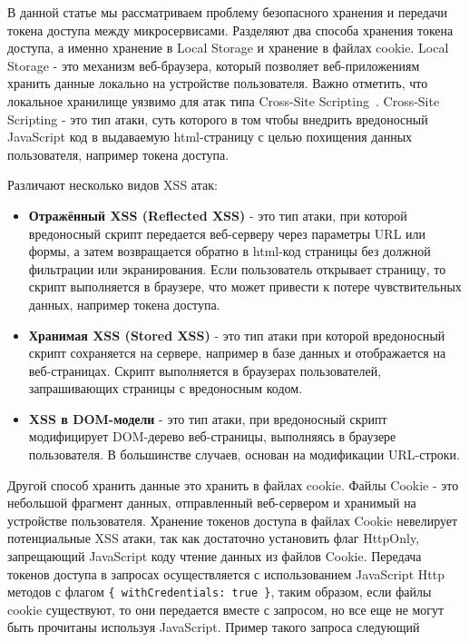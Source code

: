 В данной статье мы рассматриваем проблему безопасного хранения и передачи токена доступа между микросервисами.
Разделяют два способа хранения токена доступа, а именно хранение в Local Storage и хранение в файлах cookie.
Local Storage - это механизм веб-браузера, который позволяет веб-приложениям хранить данные локально
на устройстве пользователя.
Важно отметить, что локальное хранилище уязвимо для атак типа Cross-Site Scripting~\cite{spett2005cross}.
Cross-Site Scripting - это тип атаки, суть которого в том чтобы внедрить вредоносный JavaScript код
в выдаваемую html-страницу с целью похищения данных пользователя, например токена доступа.

Различают несколько видов XSS атак:
\begin{itemize}
    \item \textbf{Отражённый XSS (Reflected XSS)} - это тип атаки, при которой вредоносный
    скрипт передается веб-серверу через параметры URL или формы, а затем возвращается обратно в html-код страницы
    без должной фильтрации или экранирования.
    Если пользователь открывает страницу, то скрипт выполняется в браузере, что может привести к потере чувствительных данных,
    например токена доступа.
    \item \textbf{Хранимая XSS (Stored XSS)} - это тип атаки при которой вредоносный скрипт сохраняется на сервере, например
    в базе данных и отображается на веб-страницах.
    Скрипт выполняется в браузерах пользователей, запрашивающих страницы с вредоносным кодом.
    \item \textbf{XSS в DOM-модели} - это тип атаки, при вредоносный скрипт модифицирует DOM-дерево веб-страницы,
    выполняясь в браузере пользователя.
    В большинстве случаев, основан на модификации URL-строки.
\end{itemize}

Другой способ хранить данные это хранить в файлах cookie.
Файлы Cookie - это небольшой фрагмент данных, отправленный веб-сервером и хранимый на устройстве пользователя.
Хранение токенов доступа в файлах Cookie невелирует потенциальные XSS атаки, так как достаточно установить флаг HttpOnly,
запрещающий JavaScript коду чтение данных из файлов Cookie.
Передача токенов доступа в запросах осуществляется с использованием JavaScript Http методов
с флагом \texttt{\{ withCredentials: true \}},
таким образом, если файлы cookie существуют, то они передается вместе с запросом, но все еще не могут быть прочитаны используя
JavaScript.
Пример такого запроса следующий


